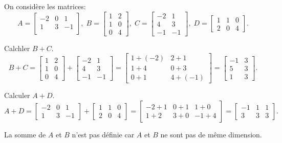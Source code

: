 \documentclass[12pt,a4paper]{book}
\begin{document}
On considère les matrices: 
\begin{equation*}
A=
\begin{bmatrix}
-2 & 0 & 1\\
1 & 3  & -1\\
\end{bmatrix},\;
B=
\begin{bmatrix}
1 & 2 \\
1 & 0 \\
0 & 4
\end{bmatrix},\;
C=
\begin{bmatrix}
-2 & 1 \\
4 & 3 \\
-1 & -1
\end{bmatrix},\;
D=
\begin{bmatrix}
1 & 1 & 0\\
2 & 0 & 4
\end{bmatrix}.
\end{equation*}
\begin{listexos}
	\item Calchler $B+C$.
	\begin{equation*}
	B+C=\begin{bmatrix}
	1 & 2 \\
	1 & 0 \\
	0 & 4
	\end{bmatrix}+
	\begin{bmatrix}
	-2 & 1 \\
	4 & 3 \\
	-1 & -1
	\end{bmatrix}=
	\begin{bmatrix}
	1+(-2) & 2+1 \\
	1+4 & 0+3 \\
	0+1 & 4+(-1)
	\end{bmatrix}=
	\begin{bmatrix}
	-1 & 3 \\
	5 & 3 \\
	1 & 3
	\end{bmatrix}.
	\end{equation*} 
	\item Calculer $A+D$.
	\begin{equation*}
	A+D=\begin{bmatrix}
	-2 & 0 & 1 \\
	1 & 3  & -1
	\end{bmatrix}+
	\begin{bmatrix}
	1 & 1 & 0\\
	2 & 0 & 4
	\end{bmatrix}=
	\begin{bmatrix}
	-2+1 & 0+1 & 1+0\\
	1+2 & 3+0 & -1+4
	\end{bmatrix}=
	\begin{bmatrix}
	-1 & 1 & 1\\
	3 & 3 & 3
	\end{bmatrix}.
	\end{equation*}
	
	\item  La somme de $A$ et $B$ n’est pas définie car $A$ et $B$ ne sont pas de même dimension.
\end{listexos}
\end{document}

